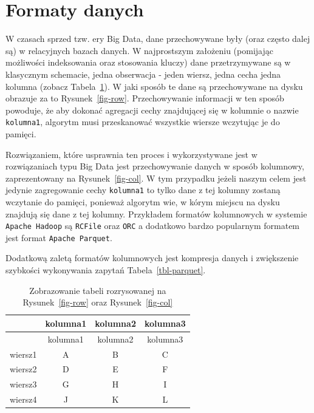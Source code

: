 \documentclass[
  letterpaper,
  DIV=11,
  numbers=noendperiod]{scrreprt}
\begin{document}
\hypertarget{formaty-danych}{%
\section*{Formaty danych}\label{formaty-danych}}


W czasach sprzed tzw. ery Big Data, dane przechowywane były (oraz często
dalej są) w relacyjnych bazach danych. W najprostszym założeniu
(pomijając możliwości indeksowania oraz stosowania kluczy) dane
przetrzymywane są w klasycznym schemacie, jedna obserwacja - jeden
wiersz, jedna cecha jedna kolumna (zobacz Tabela~\ref{tbl-logical}). W
jaki sposób te dane są przechowywane na dysku obrazuje za to
Rysunek~\ref{fig-row}. Przechowywanie informacji w ten sposób powoduje,
że aby dokonać agregacji cechy znajdującej się w kolumnie o nazwie
\texttt{kolumna1}, algorytm musi przeskanować wszystkie wiersze
wczytując je do pamięci.

Rozwiązaniem, które usprawnia ten proces i wykorzystywane jest w
rozwiązaniach typu Big Data jest przechowywanie danych w sposób
kolumnowy, zaprezentowany na Rysunek~\ref{fig-col}. W tym przypadku
jeżeli naszym celem jest jedynie zagregowanie cechy \texttt{kolumna1} to
tylko dane z tej kolumny zostaną wczytanie do pamięci, ponieważ algorytm
wie, w kórym miejscu na dysku znajdują się dane z tej kolumny.
Przykładem formatów kolumnowych w systemie \texttt{Apache\ Hadoop} są
\texttt{RCFile} oraz \texttt{ORC} a dodatkowo bardzo popularnym formatem
jest format \texttt{Apache\ Parquet}.

Dodatkową zaletą formatów kolumnowych jest kompresja danych i
zwiększenie szybkości wykonywania zapytań Tabela~\ref{tbl-parquet}.

\hypertarget{tbl-logical}{}
\begin{longtable}[]{@{}cccc@{}}
\caption{\label{tbl-logical}Zobrazowanie tabeli rozrysowanej na
Rysunek~\ref{fig-row} oraz Rysunek~\ref{fig-col}}\tabularnewline
\toprule()
& kolumna1 & kolumna2 & kolumna3 \\
\midrule()
\endfirsthead
\toprule()
& kolumna1 & kolumna2 & kolumna3 \\
\midrule()
\endhead
wiersz1 & A & B & C \\
wiersz2 & D & E & F \\
wiersz3 & G & H & I \\
wiersz4 & J & K & L \\
\bottomrule()
\end{longtable}
\end{document}
